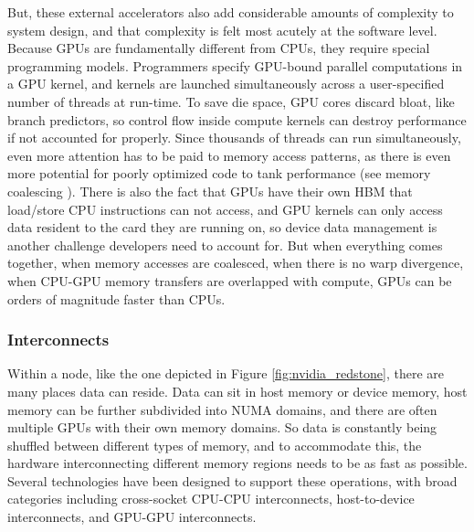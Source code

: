 But, these external accelerators also add considerable amounts of complexity to system design, and that complexity is felt most acutely at the software level.  
Because \gls{GPU}s are fundamentally different from \gls{CPU}s, they require special programming models.
Programmers specify \gls{GPU}-bound parallel computations in a \gls{GPU} kernel, and kernels are launched simultaneously across a user-specified number of threads at run-time.
To save die space, \gls{GPU} cores discard bloat, like branch predictors, so control flow inside compute kernels can destroy performance if not accounted for properly.
Since thousands of threads can run simultaneously, even more attention has to be paid to memory access patterns, as there is even more potential for poorly optimized code to tank performance (see memory coalescing \cite{CUDAMemCoalescing}).
There is also the fact that \gls{GPU}s have their own \gls{HBM} that load/store \gls{CPU} instructions can not access, and \gls{GPU} kernels can only access data resident to the card they are running on, so device data management is another challenge developers need to account for. 
But when everything comes together, when memory accesses are coalesced, when there is no warp divergence, when \gls{CPU}-\gls{GPU} memory transfers are overlapped with compute, \gls{GPU}s can be orders of magnitude faster than \gls{CPU}s.

\subsubsection{Interconnects}\label{sec:CH2-interconnects}
Within a node, like the one depicted in Figure \ref{fig:nvidia_redstone}, there are many places data can reside.
Data can sit in host memory or device memory, host memory can be further subdivided into \gls{NUMA} domains, and there are often multiple \gls{GPU}s with their own memory domains.
So data is constantly being shuffled between different types of memory, and to accommodate this, the hardware interconnecting different memory regions needs to be as fast as possible.
Several technologies have been designed to support these operations, with broad categories including cross-socket \gls{CPU}-\gls{CPU} interconnects, host-to-device interconnects, and  \gls{GPU}-\gls{GPU} interconnects.



